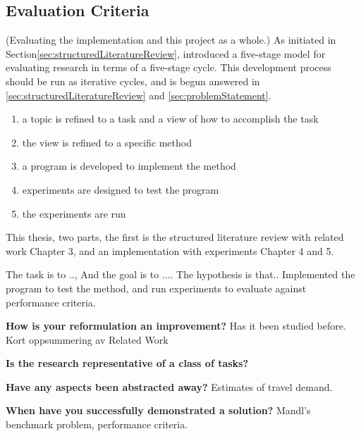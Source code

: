 \subsection{Evaluation Criteria}
\label{subsec:evaluationCriteraCohen}

(Evaluating the implementation and this project as a whole.)
As initiated in Section\vref{sec:structuredLiteratureReview}, \citet{cohen88} introduced a five-stage model for evaluating research in terms of a five-stage cycle. This development process should be run as iterative cycles, and is begun answered in \vref{sec:structuredLiteratureReview} and \vref{sec:problemStatement}.
\begin{enumerate}
\item a topic is refined to a task and a view of how to accomplish the task
\item the view is refined to a specific method
\item a program is developed to implement the method
\item experiments are designed to test the program
\item the experiments are run
\end{enumerate} 

This thesis, two parts, the first is the structured literature review with related work Chapter 3, and an implementation with experiments Chapter 4 and 5. 

The task is to .., And the goal is to .... The hypothesis is that.. Implemented the program to test the method, and run experiments to evaluate against performance criteria.

\textbf{How is your reformulation an improvement?}
Has it been studied before. Kort oppsummering av Related Work 

\textbf{Is the research representative of a class of tasks?}

\textbf{Have any aspects been abstracted away?}
Estimates of travel demand.

\textbf{When have you successfully demonstrated a solution?}
Mandl's benchmark problem, performance criteria.